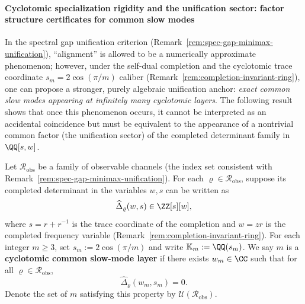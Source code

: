 \paragraph{Cyclotomic specialization rigidity and the unification sector: factor structure certificates for common slow modes}
In the spectral gap unification criterion (Remark~\ref{rem:spec-gap-minimax-unification}), ``alignment'' is allowed to be a numerically approximate phenomenon; however, under the self-dual completion and the cyclotomic trace coordinate \(s_m=2\cos(\pi/m)\) caliber (Remark~\ref{rem:completion-invariant-ring}), one can propose a stronger, purely algebraic unification anchor: \emph{exact common slow modes appearing at infinitely many cyclotomic layers}.
The following result shows that once this phenomenon occurs, it cannot be interpreted as an accidental coincidence but must be equivalent to the appearance of a nontrivial common factor (the unification sector) of the completed determinant family in \(\QQ[s,w]\).

\begin{definition}\label{def:cyclotomic-common-slowmode-layer}
Let \(\mathcal{R}_{\mathrm{obs}}\) be a family of observable channels (the index set consistent with Remark~\ref{rem:spec-gap-minimax-unification}).
For each \(\varrho\in\mathcal{R}_{\mathrm{obs}}\), suppose its completed determinant in the variables \(w,s\) can be written as
\[
\widehat{\Delta}_{\varrho}(w,s)\in\ZZ[s][w],
\]
where \(s=r+r^{-1}\) is the trace coordinate of the completion and \(w=zr\) is the completed frequency variable (Remark~\ref{rem:completion-invariant-ring}).
For each integer \(m\ge 3\), set \(s_m:=2\cos(\pi/m)\) and write \(\mathbb{K}_m:=\QQ(s_m)\).
We say \(m\) is a \textbf{cyclotomic common slow-mode layer} if there exists \(w_m\in\CC\) such that for all \(\varrho\in\mathcal{R}_{\mathrm{obs}}\),
\[
\widehat{\Delta}_{\varrho}(w_m,s_m)=0.
\]
Denote the set of \(m\) satisfying this property by \(\mathcal{U}(\mathcal{R}_{\mathrm{obs}})\).
\end{definition}


